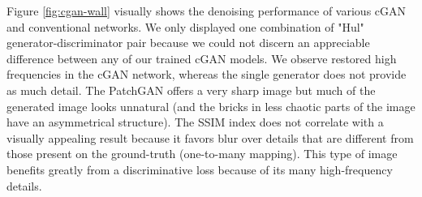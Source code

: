 Figure \ref{fig:cgan-wall} visually shows the denoising performance of various \ac{cGAN} and conventional networks. We only displayed one combination of "Hul" generator-discriminator pair because we could not discern an appreciable difference between any of our trained \ac{cGAN} models. We observe restored high frequencies in the \ac{cGAN} network, whereas the single generator does not provide as much detail. The PatchGAN offers a very sharp image but much of the generated image looks unnatural (and the bricks in less chaotic parts of the image have an asymmetrical structure). The SSIM index does not correlate with a visually appealing result because it favors blur over details that are different from those present on the ground-truth (one-to-many mapping). This type of image benefits greatly from a discriminative loss because of its many high-frequency details.

